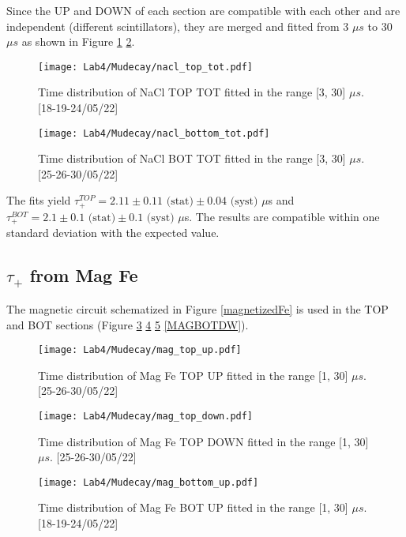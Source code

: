 \documentclass[10pt,a4paper,twocolumn]{article}
\begin{document}
Since the UP and DOWN of each section are compatible with each other and are independent (different scintillators), they are merged and fitted from 3 $\mu s$ to 30 $\mu s$ as shown in Figure \ref{NACLTOP} \ref{NACLBOT}.

\begin{figure}[h!]
\centering
\caption{Time distribution of NaCl TOP TOT fitted in the range [3, 30] $\mu s$. [18-19-24/05/22]}
\texttt{[image: Lab4/Mudecay/nacl\_top\_tot.pdf]}
\label{NACLTOP}
\end{figure}


\begin{figure}[h!]
\centering
\caption{Time distribution of NaCl BOT TOT fitted in the range [3, 30] $\mu s$. [25-26-30/05/22]}
\texttt{[image: Lab4/Mudecay/nacl\_bottom\_tot.pdf]}
\label{NACLBOT}
\end{figure}



The fits yield  $\tau_+^{TOP}=2.11 \pm 0.11 \text{ (stat)} \pm 0.04 \text{ (syst) }\mu$s and $\tau_+^{BOT}=2.1 \pm 0.1 \text{ (stat)} \pm 0.1 \text{ (syst) }\mu$s. The results are compatible within one standard deviation with the expected value.

\subsection{$\tau_+$ from Mag Fe}

The magnetic circuit schematized in Figure \ref{magnetizedFe} is used in the TOP and BOT sections (Figure \ref{MAGTOPUP} \ref{MAGTOPDW} \ref{MAGBOTUP} \ref{MAGBOTDW}). 

\begin{figure}[h!]
\centering
\caption{Time distribution of Mag Fe TOP UP fitted in the range [1, 30] $\mu s$. [25-26-30/05/22]}
\texttt{[image: Lab4/Mudecay/mag\_top\_up.pdf]} 
\label{MAGTOPUP}
\end{figure}

\begin{figure}[h!]
\centering
\caption{Time distribution of Mag Fe TOP DOWN fitted in the range [1, 30] $\mu s$. [25-26-30/05/22]}
\texttt{[image: Lab4/Mudecay/mag\_top\_down.pdf]}
\label{MAGTOPDW}
\end{figure}

\begin{figure}[h!]
\centering
\caption{Time distribution of Mag Fe BOT UP fitted in the range [1, 30] $\mu s$. [18-19-24/05/22]}
\texttt{[image: Lab4/Mudecay/mag\_bottom\_up.pdf]}
\label{MAGBOTUP}
\end{figure}
\end{document}

